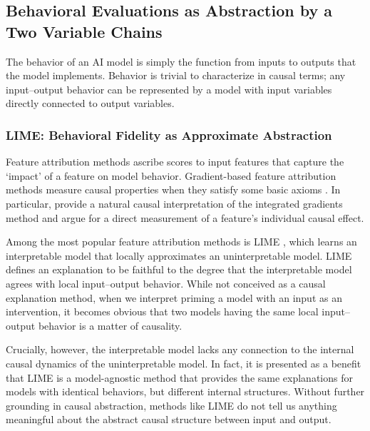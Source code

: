 \documentclass[twoside,11pt]{article}
\begin{document}
\subsection{Behavioral Evaluations as Abstraction by a Two Variable Chains}\label{sec:behave}
The behavior of an AI model is simply the function from inputs to outputs that the model implements. Behavior is trivial to characterize in causal terms; any input--output behavior can be represented by a model with input variables directly connected to output variables. 

\subsubsection{LIME: Behavioral Fidelity as Approximate Abstraction}
Feature attribution methods ascribe scores to input features that capture the `impact' of a feature on model behavior. Gradient-based feature attribution methods \citep{Zeiler2014,springerberg2014,Shrikumar16,Binder16, Lundberg:2017, kim2018interpretability,Narendra:2018, lundberg2019consistent,schrouff2022best} measure causal properties when they satisfy some basic axioms \citep{sundararajan2017axiomatic}. In particular, \cite{geiger2021causal} provide a natural causal interpretation of the integrated gradients method and \cite{chattopadhyay19a} argue for a direct measurement of a feature's individual causal effect.

Among the most popular feature attribution methods is LIME \citep{Ribeiro2016}, which learns an interpretable model that locally approximates an uninterpretable model. LIME defines an explanation to be faithful to the degree that the interpretable model agrees with local input--output behavior. While not conceived as a causal explanation method, when we interpret priming a model with an input as an intervention, it becomes obvious that two models having the same local input--output behavior is a matter of causality. 

Crucially, however, the interpretable model lacks any connection to the internal causal dynamics of the uninterpretable model. In fact, it is presented as a benefit that LIME is a model-agnostic method that provides the same explanations for models with identical behaviors, but different internal structures. Without further grounding in causal abstraction, methods like LIME do not tell us anything meaningful about the abstract causal structure between input and output. 
\end{document}
